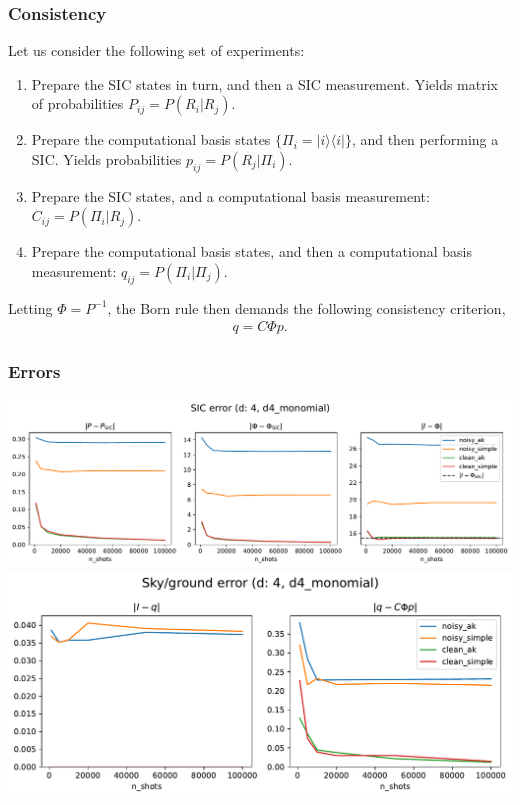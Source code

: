 \documentclass{beamer}
\begin{document}
\begin{frame}
\frametitle{Consistency}
Let us consider the following set of experiments:
\begin{enumerate}
\item Prepare the SIC states in turn, and then a SIC measurement. Yields matrix of probabilities $P_{ij}=P(R_i|R_j)$.
\item Prepare the computational basis states $\{\Pi_i=|i\rangle\langle i|\}$, and then performing a SIC. Yields probabilities $p_{ij} = P(R_j|\Pi_i)$.
\item Prepare the SIC states, and a computational basis measurement: $C_{ij}=P(\Pi_i|R_j)$.
\item Prepare the computational basis states, and then a computational basis measurement: $q_{ij}=P(\Pi_i|\Pi_j)$.
\end{enumerate}
	Letting $\Phi=P^{-1}$, the Born rule then demands the following consistency criterion,
\begin{align}
q = C\Phi p.	
\end{align}
\end{frame}

\begin{frame}
\frametitle{Errors}
\begin{center}
\includegraphics[scale=0.36]{img/sic_metrics_d4_d4_monomial}	
\includegraphics[scale=0.36]{img/sg_metrics_d4_d4_monomial}	
\end{center}	
\end{frame}
\end{document}
